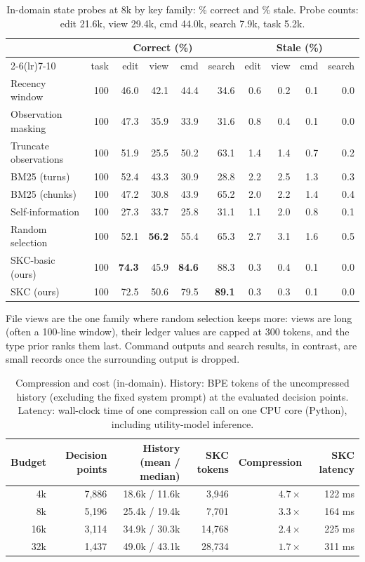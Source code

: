\begin{table}[h]
\centering
\small
\caption{In-domain state probes at 8k by key family: \% correct and \% stale.
Probe counts: edit 21.6k, view 29.4k, cmd 44.0k, search 7.9k, task 5.2k.}
\label{tab:by-family}
\setlength{\tabcolsep}{4pt}
\begin{tabular}{l rrrrr rrrr}
\toprule
 & \multicolumn{5}{c}{Correct (\%)} & \multicolumn{4}{c}{Stale (\%)} \\
\cmidrule(lr){2-6}\cmidrule(lr){7-10}
 & task & edit & view & cmd & search & edit & view & cmd & search \\
\midrule
Recency window & 100 & 46.0 & 42.1 & 44.4 & 34.6 & 0.6 & 0.2 & 0.1 & 0.0 \\
Observation masking & 100 & 47.3 & 35.9 & 33.9 & 31.6 & 0.8 & 0.4 & 0.1 & 0.0 \\
Truncate observations & 100 & 51.9 & 25.5 & 50.2 & 63.1 & 1.4 & 1.4 & 0.7 & 0.2 \\
BM25 (turns) & 100 & 52.4 & 43.3 & 30.9 & 28.8 & 2.2 & 2.5 & 1.3 & 0.3 \\
BM25 (chunks) & 100 & 47.2 & 30.8 & 43.9 & 65.2 & 2.0 & 2.2 & 1.4 & 0.4 \\
Self-information & 100 & 27.3 & 33.7 & 25.8 & 31.1 & 1.1 & 2.0 & 0.8 & 0.1 \\
Random selection & 100 & 52.1 & \textbf{56.2} & 55.4 & 65.3 & 2.7 & 3.1 & 1.6 & 0.5 \\
SKC-basic (ours) & 100 & \textbf{74.3} & 45.9 & \textbf{84.6} & 88.3 & 0.3 & 0.4 & 0.1 & 0.0 \\
SKC (ours) & 100 & 72.5 & 50.6 & 79.5 & \textbf{89.1} & 0.3 & 0.3 & 0.1 & 0.0 \\
\bottomrule
\end{tabular}
\end{table}

File views are the one family where random selection keeps more: views are
long (often a 100-line window), their ledger values are capped at 300 tokens, and
the type prior ranks them last. Command outputs and search results, in
contrast, are small records once the surrounding output is dropped.

\begin{table}[h]
\centering
\small
\caption{Compression and cost (in-domain). History: BPE tokens of the
uncompressed history (excluding the fixed system prompt) at the evaluated
decision points. Latency: wall-clock time of one compression call on one CPU
core (Python), including utility-model inference.}
\label{tab:efficiency}
\begin{tabular}{r rrr r r}
\toprule
Budget & Decision points & History (mean / median) & SKC tokens & Compression & SKC latency \\
\midrule
4k & 7{,}886 & 18.6k / 11.6k & 3{,}946 & $4.7\times$ & 122 ms \\
8k & 5{,}196 & 25.4k / 19.4k & 7{,}701 & $3.3\times$ & 164 ms \\
16k & 3{,}114 & 34.9k / 30.3k & 14{,}768 & $2.4\times$ & 225 ms \\
32k & 1{,}437 & 49.0k / 43.1k & 28{,}734 & $1.7\times$ & 311 ms \\
\bottomrule
\end{tabular}
\end{table}


